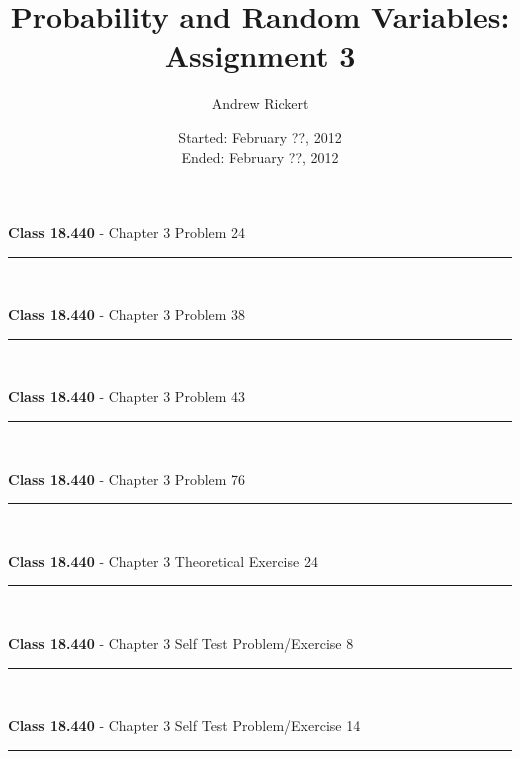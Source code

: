 \documentclass[11pt,reqno]{article}
\title{Probability and Random Variables: \\ Assignment 3}
\author{Andrew Rickert}
\date{Started: February ??, 2012 \\ \hspace{1pt} Ended: February ??,  2012}                                           %
\begin{document}
\maketitle

\noindent {} \par

\begin{flushleft} 
\textbf{Class 18.440} - Chapter 3 Problem 24\\
\rule{500pt}{1pt}\\
\end{flushleft} 


\vspace{15pt}
\begin{flushleft} 
\textbf{Class 18.440} - Chapter 3 Problem 38\\
\rule{500pt}{1pt}\\
\end{flushleft} 


\vspace{15pt}
\begin{flushleft} 
\textbf{Class 18.440} - Chapter 3 Problem 43\\
\rule{500pt}{1pt}\\
\end{flushleft} 


\vspace{15pt}
\begin{flushleft} 
\textbf{Class 18.440} - Chapter 3 Problem 76\\
\rule{500pt}{1pt}\\
\end{flushleft} 
  
  
\vspace{15pt}
\begin{flushleft} 
\textbf{Class 18.440} - Chapter 3 Theoretical Exercise 24\\
\rule{500pt}{1pt}\\
\end{flushleft} 


\vspace{15pt}
\begin{flushleft} 
\textbf{Class 18.440} - Chapter 3 Self Test Problem/Exercise 8\\
\rule{500pt}{1pt}\\
\end{flushleft} 


\vspace{15pt}
\begin{flushleft} 
\textbf{Class 18.440} - Chapter 3 Self Test Problem/Exercise 14\\
\rule{500pt}{1pt}\\
\end{flushleft} 
\end{document}
